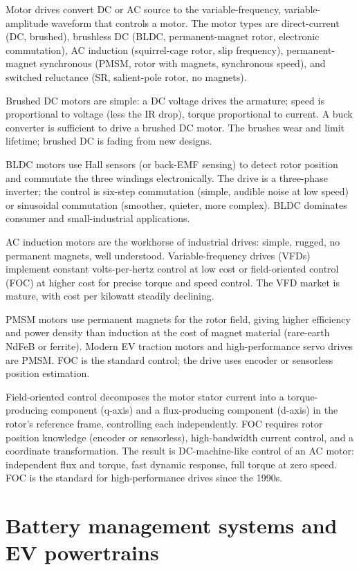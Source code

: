 Motor drives convert DC or AC source to the variable-frequency, variable-amplitude waveform that controls a motor. The motor types are direct-current (DC, brushed), brushless DC (BLDC, permanent-magnet rotor, electronic commutation), AC induction (squirrel-cage rotor, slip frequency), permanent-magnet synchronous (PMSM, rotor with magnets, synchronous speed), and switched reluctance (SR, salient-pole rotor, no magnets).

Brushed DC motors are simple: a DC voltage drives the armature; speed is proportional to voltage (less the IR drop), torque proportional to current. A buck converter is sufficient to drive a brushed DC motor. The brushes wear and limit lifetime; brushed DC is fading from new designs.

BLDC motors use Hall sensors (or back-EMF sensing) to detect rotor position and commutate the three windings electronically. The drive is a three-phase inverter; the control is six-step commutation (simple, audible noise at low speed) or sinusoidal commutation (smoother, quieter, more complex). BLDC dominates consumer and small-industrial applications.

AC induction motors are the workhorse of industrial drives: simple, rugged, no permanent magnets, well understood. Variable-frequency drives (VFDs) implement constant volts-per-hertz control at low cost or field-oriented control (FOC) at higher cost for precise torque and speed control. The VFD market is mature, with cost per kilowatt steadily declining.

PMSM motors use permanent magnets for the rotor field, giving higher efficiency and power density than induction at the cost of magnet material (rare-earth NdFeB or ferrite). Modern EV traction motors and high-performance servo drives are PMSM. FOC is the standard control; the drive uses encoder or sensorless position estimation.

Field-oriented control decomposes the motor stator current into a torque-producing component (q-axis) and a flux-producing component (d-axis) in the rotor's reference frame, controlling each independently. FOC requires rotor position knowledge (encoder or sensorless), high-bandwidth current control, and a coordinate transformation. The result is DC-machine-like control of an AC motor: independent flux and torque, fast dynamic response, full torque at zero speed. FOC is the standard for high-performance drives since the 1990s.

\section{Battery management systems and EV powertrains}

